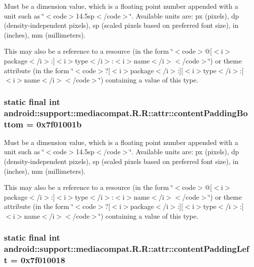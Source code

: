 Must be a dimension value, which is a floating point number appended with a unit such as \char`\"{}$<$code$>$14.5sp$<$/code$>$\char`\"{}. Available units are: px (pixels), dp (density-independent pixels), sp (scaled pixels based on preferred font size), in (inches), mm (millimeters). 

This may also be a reference to a resource (in the form \char`\"{}$<$code$>$@\mbox{[}$<$i$>$package$<$/i$>$:\mbox{]}$<$i$>$type$<$/i$>$:$<$i$>$name$<$/i$>$$<$/code$>$\char`\"{}) or theme attribute (in the form \char`\"{}$<$code$>$?\mbox{[}$<$i$>$package$<$/i$>$:\mbox{]}\mbox{[}$<$i$>$type$<$/i$>$:\mbox{]}$<$i$>$name$<$/i$>$$<$/code$>$\char`\"{}) containing a value of this type. \hypertarget{classandroid_1_1support_1_1mediacompat_1_1_r_1_1attr_8b14956aeec803a678bcfa6de1a43e03}{
\subsubsection[{contentPaddingBottom}]{\setlength{\rightskip}{0pt plus 5cm}static final int android::support::mediacompat.R.R::attr::contentPaddingBottom = 0x7f01001b}}
\label{classandroid_1_1support_1_1mediacompat_1_1_r_1_1attr_8b14956aeec803a678bcfa6de1a43e03}


Must be a dimension value, which is a floating point number appended with a unit such as \char`\"{}$<$code$>$14.5sp$<$/code$>$\char`\"{}. Available units are: px (pixels), dp (density-independent pixels), sp (scaled pixels based on preferred font size), in (inches), mm (millimeters). 

This may also be a reference to a resource (in the form \char`\"{}$<$code$>$@\mbox{[}$<$i$>$package$<$/i$>$:\mbox{]}$<$i$>$type$<$/i$>$:$<$i$>$name$<$/i$>$$<$/code$>$\char`\"{}) or theme attribute (in the form \char`\"{}$<$code$>$?\mbox{[}$<$i$>$package$<$/i$>$:\mbox{]}\mbox{[}$<$i$>$type$<$/i$>$:\mbox{]}$<$i$>$name$<$/i$>$$<$/code$>$\char`\"{}) containing a value of this type. \hypertarget{classandroid_1_1support_1_1mediacompat_1_1_r_1_1attr_f3065debe96e3f9cc1920e21d65e8523}{
\subsubsection[{contentPaddingLeft}]{\setlength{\rightskip}{0pt plus 5cm}static final int android::support::mediacompat.R.R::attr::contentPaddingLeft = 0x7f010018}}
\label{classandroid_1_1support_1_1mediacompat_1_1_r_1_1attr_f3065debe96e3f9cc1920e21d65e8523}


